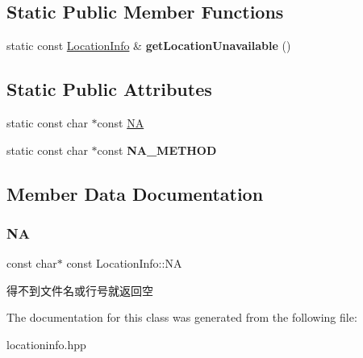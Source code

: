 \subsection*{Static Public Member Functions}
\begin{DoxyCompactItemize}
\item 
\mbox{\label{classLocationInfo_a4b42451adbc0a1a4cb18124c54d3d868}} 
static const \hyperlink{classLocationInfo}{Location\+Info} \& {\bfseries get\+Location\+Unavailable} ()
\end{DoxyCompactItemize}
\subsection*{Static Public Attributes}
\begin{DoxyCompactItemize}
\item 
static const char $\ast$const \hyperlink{classLocationInfo_ac9279ec03024831abff8c08e1e511a82}{NA}
\item 
\mbox{\label{classLocationInfo_acbd770de5c78561b42dcd758364e5bc6}} 
static const char $\ast$const {\bfseries N\+A\+\_\+\+M\+E\+T\+H\+OD}
\end{DoxyCompactItemize}


\subsection{Member Data Documentation}
\mbox{\label{classLocationInfo_ac9279ec03024831abff8c08e1e511a82}} 
\subsubsection{\texorpdfstring{NA}{NA}}
{\footnotesize\ttfamily const char$\ast$ const Location\+Info\+::\+NA\hspace{0.3cm}{\ttfamily [static]}}

得不到文件名或行号就返回空 

The documentation for this class was generated from the following file\+:\begin{DoxyCompactItemize}
\item 
locationinfo.\+hpp\end{DoxyCompactItemize}
